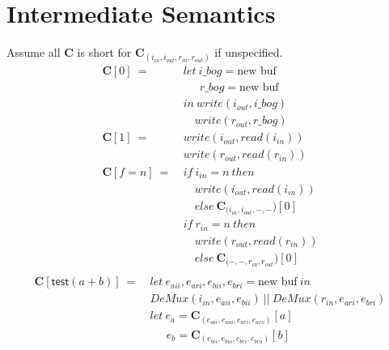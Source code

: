 \documentclass[12pt, letterpaper]{article}
\begin{document}
\section{Intermediate Semantics}
  Assume all $\mathbf{C}$ is short for $\mathbf{C}_{(i_{in},i_{out},r_{in},r_{out})}$ if unspecified.
  {\fontsize{12pt}{14pt}\selectfont
  \begin{align*}
    \mathbf{C}[0]\ 
      =\ &
      let\ i\_bog = \text{new buf}\\
      &\quad\ \ r\_bog = \text{new buf}\\
      &in\ write(i_{out}, i\_bog)\\
      &\quad  write(r_{out}, r\_bog)\\
    \mathbf{C}[1]\ 
      =\ &
      write(i_{out}, read(i_{in}))\\
      &write(r_{out}, read(r_{in}))
      \\
    \mathbf{C}[f = n]\
       =\
       &if\ i_{in}=n\ then\\
       &\quad write(i_{out}, read(i_{in}))\\
       &\quad else\ \mathbf{C}_{(i_{in}, i_{out}, -, -})[0]\\
       &if\ r_{in}=n\ then\\
       &\quad write(r_{out}, read(r_{in}))\\
       &\quad else\ \mathbf{C}_{(-, -, r_{in}, r_{out}})[0]\\
  \end{align*}
  \begin{align*}
    \mathbf{C}[\mathsf{test}(a + b)]\ 
      =\ &
      let\ e_{aii}, e_{ari}, e_{bii}, e_{bri} = \text{new buf}\ in\\
         &DeMux(i_{in}, e_{aii}, e_{bii})\ ||\ DeMux(r_{in}, e_{ari}, e_{bri})\\
      &let\ e_a = \mathbf{C}_{(e_{aii},e_{aio},e_{ari},e_{aro})}[a]\\
      &\quad\ \ e_b = \mathbf{C}_{(e_{bii},e_{bio},e_{bri},e_{bro})}[b]\\

\end{align*}}
\end{document}
